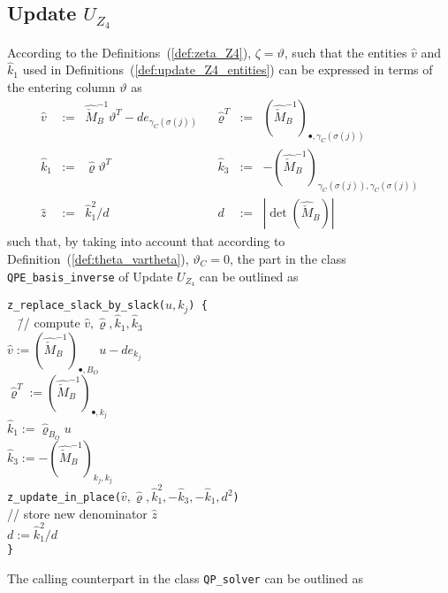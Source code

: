 \documentclass[a4paper]{article}
\begin{document}
\subsection{Update $U_{Z_{4}}$}
According to the Definitions~(\ref{def:zeta_Z4}),
$\zeta=\vartheta$, such that the entities $\hat{v}$ and $\hat{k}_{1}$ used
in Definitions~(\ref{def:update_Z4_entities}) can be expressed in terms
of the entering column $\vartheta$ as
\begin{equation}
\label{def:update_Z4_entities_prep}
\begin{array}{rclcrcl}
\hat{v}
&:=&
\hat{\check{M}}_{B}^{-1}\vartheta^{T} -de_{\gamma_{C}(\sigma(j))}
&&
\hat{\varrho}^{T}
&:=&
\left(\hat{\check{M}}_{B}^{-1}\right)_{\bullet, \gamma_{C}(\sigma(j))}
\\
\hat{k}_{1}
&:=&
\hat{\varrho}\vartheta^{T}
&&
\hat{k}_{3}
&:=&
-\left(\hat{\check{M}}_{B}^{-1}\right)_{\gamma_{C}(\sigma(j)),
  \gamma_{C}(\sigma(j))}
\\
\hat{z}
&:=&
\hat{k}_{1}^{2}/d
&&
d
&:=&
\left|\det(\hat{\check{M}}_{B})\right|
\end{array}
\end{equation}
such that, by taking into account that according to
Definition~(\ref{def:theta_vartheta}), $\vartheta_{C}=0$,
the part in the class \texttt{QPE\_basis\_inverse} of
Update $U_{Z_{4}}$ can be outlined as
\begin{tabbing}
\texttt{z\_replace\_slack\_by\_slack($u, k_{j}$) \{} \\
\texttt{  } \= // compute $\hat{v}, \hat{\varrho}, \hat{k}_{1}, \hat{k}_{3}$ \\
\> \texttt{$\hat{v}:=
    \left(\hat{\check{M}}_{B}^{-1}\right)_{\bullet, B_{O}}u-de_{k_{j}}$} \\
\> \texttt{$\hat{\varrho}^{T}:=
  \left(\hat{\check{M}}_{B}^{-1}\right)_{\bullet,k_{j}}$} \\
\> \texttt{$\hat{k}_{1}:=\hat{\varrho}_{B_{O}}u$} \\
\> \texttt{$\hat{k}_{3}:=
  -\left(\hat{\check{M}}_{B}^{-1}\right)_{k_{j}, k_{j}}$} \\
\> \texttt{z\_update\_in\_place($\hat{v}, \hat{\varrho}, \hat{k}_{1}^{2},
-\hat{k}_{3}, -\hat{k}_{1}, d^{2}$)} \\
\> // store new denominator $\hat{z}$ \\
\> \texttt{$d:=\hat{k}_{1}^{2}/d$} \\
\texttt{\}}
\end{tabbing}
The calling counterpart in the class \texttt{QP\_solver} can be outlined as
\end{document}

